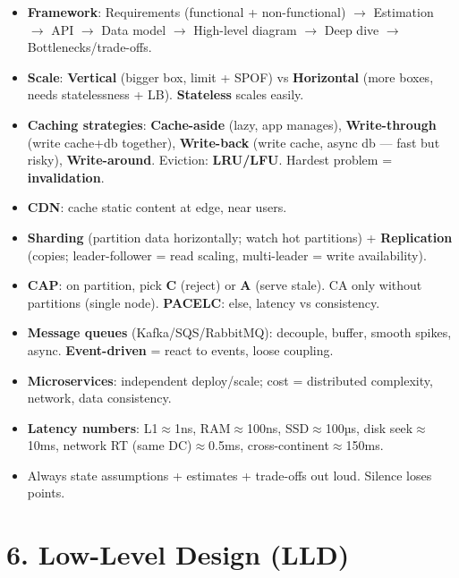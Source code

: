 \documentclass[11pt]{article}
\providecommand{\tightlist}{\setlength{\itemsep}{1pt}\setlength{\parskip}{0pt}}
\begin{document}
\begin{itemize}
\tightlist
\item
  \textbf{Framework}: Requirements (functional + non-functional) \(\rightarrow\) Estimation \(\rightarrow\) API \(\rightarrow\) Data model \(\rightarrow\) High-level diagram \(\rightarrow\) Deep dive \(\rightarrow\) Bottlenecks/trade-offs.
\item
  \textbf{Scale}: \textbf{Vertical} (bigger box, limit + SPOF) vs \textbf{Horizontal} (more boxes, needs statelessness + LB). \textbf{Stateless} scales easily.
\item
  \textbf{Caching strategies}: \textbf{Cache-aside} (lazy, app manages), \textbf{Write-through} (write cache+db together), \textbf{Write-back} (write cache, async db --- fast but risky), \textbf{Write-around}. Eviction: \textbf{LRU/LFU}. Hardest problem = \textbf{invalidation}.
\item
  \textbf{CDN}: cache static content at edge, near users.
\item
  \textbf{Sharding} (partition data horizontally; watch hot partitions) + \textbf{Replication} (copies; leader-follower = read scaling, multi-leader = write availability).
\item
  \textbf{CAP}: on partition, pick \textbf{C} (reject) or \textbf{A} (serve stale). CA only without partitions (single node). \textbf{PACELC}: else, latency vs consistency.
\item
  \textbf{Message queues} (Kafka/SQS/RabbitMQ): decouple, buffer, smooth spikes, async. \textbf{Event-driven} = react to events, loose coupling.
\item
  \textbf{Microservices}: independent deploy/scale; cost = distributed complexity, network, data consistency.
\item
  \textbf{Latency numbers}: L1\(\approx\)1ns, RAM\(\approx\)100ns, SSD\(\approx\)100µs, disk seek\(\approx\)10ms, network RT (same DC)\(\approx\)0.5ms, cross-continent\(\approx\)150ms.
\item
  Always state assumptions + estimates + trade-offs out loud. Silence loses points.
\end{itemize}

\section{6. Low-Level Design (LLD)}\label{6-low-level-design-lld}
\end{document}
